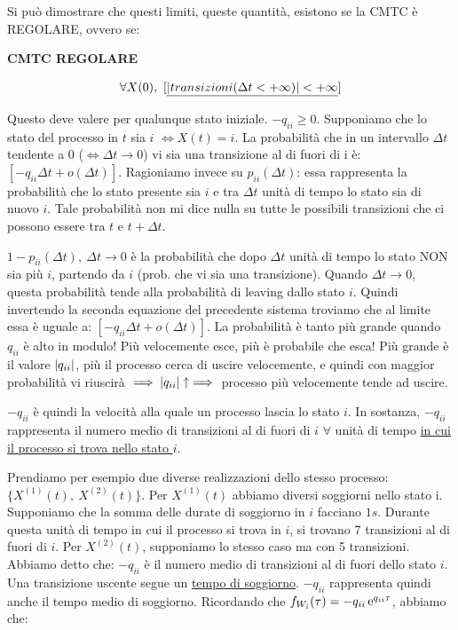 Si può dimostrare che questi limiti, queste quantità, esistono se la CMTC è REGOLARE, ovvero se:

\begin{defn}{\textbf{CMTC REGOLARE}}

\[
	\forall X(0),\ [\underline{\cardinality{transizioni(\Delta t < +\infty)} < +\infty}]
\]
\end{defn}

Questo deve valere per qualunque stato iniziale. $-q_{ii} \geq 0$. Supponiamo che lo stato del processo in $t$ sia $i$ $\iff X(t) = i$. La probabilità che in un intervallo $\Delta t$ tendente a 0 ($\iff \Delta t \to 0$) vi sia una transizione al di fuori di i è: $[-q_{ii}\Delta  t + o(\Delta t)]$.
Ragioniamo invece su $p_{ii}(\Delta t)$: essa rappresenta la probabilità che lo stato presente sia $i$ e tra $\Delta t$ unità di tempo lo stato sia di nuovo $i$. Tale probabilità non mi dice nulla su tutte le possibili transizioni che ci possono essere tra $t$ e $t+\Delta t$.

$1-p_{ii}(\Delta t),\ \Delta t \to 0$ è la probabilità che dopo $\Delta t$ unità di tempo lo stato NON sia più $i$, partendo da $i$ (prob. che vi sia una transizione). Quando $\Delta t \to 0$, questa probabilità tende alla probabilità di leaving dallo stato $i$. Quindi invertendo la seconda equazione del precedente sistema troviamo che al limite essa è uguale a: $[-q_{ii}\Delta t + o(\Delta t)]$. La probabilità è tanto più grande quando $q_{ii}$ è alto in modulo! Più velocemente esce, più è probabile che esca! Più grande è il valore $\lvert q_{ii}\rvert$, più il processo cerca di uscire velocemente, e quindi con maggior probabilità vi riuscirà $\implies \lvert q_{ii}\rvert \uparrow \implies$ processo più velocemente tende ad uscire.

$-q_{ii}$ è quindi la velocità alla quale un processo lascia lo stato $i$. In sostanza, $-q_{ii}$ rappresenta il numero medio di transizioni al di fuori di $i$ $\forall$ unità di tempo \newline
\underline{in cui il processo si trova nello stato $i$}.

Prendiamo per esempio due diverse realizzazioni dello stesso processo: $\{X^{(1)}(t),\ X^{(2)}(t)\}$. Per $X^{(1)}(t)$ abbiamo diversi soggiorni nello stato i. Supponiamo che la somma delle durate di soggiorno in $i$ facciano $1s$. Durante questa unità di tempo in cui il processo si trova in $i$, si trovano 7 transizioni al di fuori di $i$. Per $X^{(2)}(t)$, supponiamo lo stesso caso ma con 5 transizioni. Abbiamo detto che: $-q_{ii}$ è il numero medio di transizioni al di fuori dello stato $i$. Una transizione uscente segue un \underline{tempo di soggiorno}. $-q_{ii}$ rappresenta quindi anche il tempo medio di soggiorno. Ricordando che $f_{W_i}(\tau) = -q_{ii}\mathop{}\!\mathrm{e}^{q_{ii}\tau}$, abbiamo che:

